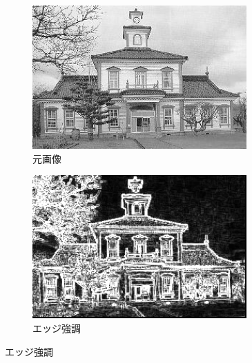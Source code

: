 \documentclass[a4paper,12pt]{jsarticle}
\begin{document}
\begin{figure}[!htbp]
\centering
\begin{subfigure}[b]{0.45\textwidth}
    \centering
    \includegraphics[width=0.9\textwidth]{./sampleimages/sample9.png}
    \caption{元画像}
\end{subfigure}
\hfill
\begin{subfigure}[b]{0.45\textwidth}
    \centering
    \includegraphics[width=0.9\textwidth]{./images/edge_enhanced_sample9_edge.png}
    \caption{エッジ強調}
\end{subfigure}


\end{figure}
\end{document}
